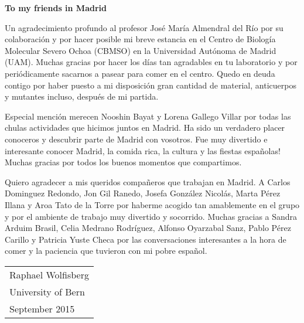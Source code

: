 \begin{addmargin}{0.025\textwidth}
\newpage
\noindent 
\Large\textbf{To my friends in Madrid}

\normalsize
\par\bigskip
\noindent 
Un agradecimiento profundo al profesor José María Almendral del Río por su colaboración y por hacer posible mi breve estancia en el Centro de Biología Molecular Severo Ochoa (CBMSO) en la Universidad Autónoma de Madrid (UAM). Muchas gracias por hacer los días tan agradables en tu laboratorio y por periódicamente sacarnos a pasear para comer en el centro. Quedo en deuda contigo por haber puesto a mi disposición gran cantidad de material, anticuerpos y mutantes incluso, después de mi partida.

\par\medskip 
\noindent
Especial mención merecen Nooshin Bayat y Lorena Gallego Villar por todas las chulas actividades que hicimos juntos en Madrid. Ha sido un verdadero placer conoceros y descubrir parte de Madrid con vosotros. Fue muy divertido e interesante conocer Madrid, la comida rica, la cultura y las fiestas españolas! Muchas gracias por todos los buenos momentos que compartimos.
   
\par\medskip 
\noindent   
Quiero agradecer a mis queridos compañeros que trabajan en Madrid. A Carlos Dominguez Redondo, Jon Gil Ranedo, Josefa González Nicolás, Marta Pérez Illana y Aroa Tato de la Torre por haberme acogido tan amablemente en el grupo y por el ambiente de trabajo muy divertido y socorrido. Muchas gracias a Sandra Arduim Brasil, Celia Medrano Rodríguez, Alfonso Oyarzabal Sanz, Pablo Pérez Carillo y Patricia Yuste Checa por las conversaciones interesantes a la hora de comer y la paciencia que tuvieron con mi pobre español.      
\end{addmargin}

 
\par\bigskip
\par\bigskip
\par\bigskip
\par\bigskip
\noindent \hfill\begin{tabular}{l}
Raphael Wolfisberg\\
University of Bern\\
September 2015\\
\end{tabular}

